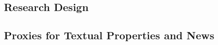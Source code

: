 \documentclass[letterpaper,12pt]{article}
\begin{document}
\begin{spacing}{1.5}
\begin{comment}
Aligned with the prior literature on the usefulness of conservatism, we argue that more complete, news-consistent and timely disclosure of bad news relative to good news enhances contract efficiency [specific hypotheses to be developed]. However, we do not make claims about the valuation role of narrative conservatism.

\end{comment}

\section{Research Design}
\subsection{Proxies for Textual Properties and News} \label{sec3.1}

\end{spacing}
\end{document}
